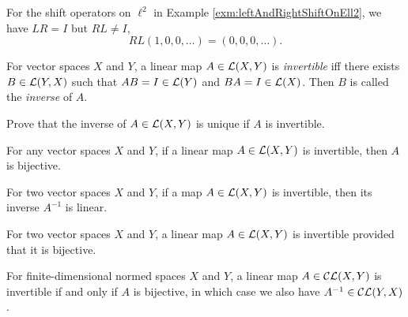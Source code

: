 \begin{exm}
  For the shift operators on $\ell^2$
  in Example \ref{exm:leftAndRightShiftOnEll2},
  we have $LR=I$ but $RL\ne I$,
  \begin{displaymath}
    RL(1,0,0,\ldots) = (0,0,0,\ldots).
  \end{displaymath}
\end{exm}

\begin{defn}
  \label{def:invertibleOps}
  For vector spaces $X$ and $Y$,
  a linear map \mbox{$A\in {\cal L}(X,Y)$} is \emph{invertible}
  iff there exists $B\in {\cal L}(Y,X)$
  such that $AB=I\in {\cal L}(Y)$
  and $BA=I\in {\cal L}(X)$. 
  Then $B$ is called the \emph{inverse} of $A$.
\end{defn}

\begin{exc}
  Prove that the inverse of $A\in {\cal L}(X,Y)$ is unique
  if $A$ is invertible.
\end{exc}

\begin{lem}
  \label{lem:invertibleImpliesBijective}
  For any vector spaces $X$ and $Y$, 
  if a linear map $A\in {\cal L}(X,Y)$ is invertible, 
  then $A$ is bijective.
\end{lem}

\begin{lem}
  \label{lem:invertibleCLmapIsLinear}
  For two vector spaces $X$ and $Y$, 
  if a map $A\in {\cal L}(X,Y)$ is invertible,
  then its inverse $A^{-1}$ is linear.
\end{lem}

\begin{lem}
  \label{lem:bijectiveImpliesInvertibleFiniteDim}
  For two vector spaces $X$ and $Y$, 
  a linear map $A\in {\cal L}(X,Y)$ is invertible
  provided that it is bijective.
\end{lem}

\begin{thm}
  For finite-dimensional normed spaces $X$ and $Y$,
  a linear map $A\in {\cal CL}(X,Y)$ is invertible
  if and only if $A$ is bijective,
  in which case we also have $A^{-1}\in {\cal CL}(Y,X)$. 
\end{thm}

